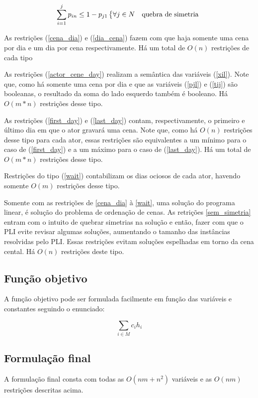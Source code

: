 \documentclass[a4paper,11pt]{article}
\begin{document}
\begin{equation}
  \sum_{i=1}^j p_{in} \leq 1 - p_{j1} \begin{dcases*} \forall j \in N & quebra de simetria \end{dcases*}
  \label{sem_simetria}
\end{equation}

As restrições (\ref{cena_dia}) e (\ref{dia_cena}) fazem com que haja somente uma
cena por dia e um dia por cena respectivamente. Há um total de $O(n)$ restrições
de cada tipo

As restrições (\ref{actor_cene_day}) realizam a semântica das variáveis (\ref{xil}).
Note que, como há somente uma cena por dia e que as variáveis (\ref{pjl}) e (\ref{tij})
são booleanas, o resultado da soma do lado esquerdo também é booleano. Há $O(m*n)$
restrições desse tipo.

As restrições (\ref{first_day}) e (\ref{last_day}) contam, respectivamente, o
primeiro e último dia em que o ator gravará uma cena. Note que, como há $O(n)$
restrições desse tipo para cada ator, essas restrições são equivalentes a um
mínimo para o caso de (\ref{first_day}) e a um máximo para o caso de (\ref{last_day}).
Há um total de $O(m*n)$ restrições desse tipo.

Restrições do tipo (\ref{wait}) contabilizam os dias ociosos de cada ator, havendo
somente $O(m)$ restrições desse tipo.

Somente com as restrições de \ref{cena_dia} à \ref{wait}, uma solução do programa
linear, é solução do problema de ordenação de cenas. As retrições \ref{sem_simetria}
entram com o intuito de quebrar simetrias na solução e então, fazer com que o PLI
evite revisar algumas soluções, aumentando o tamanho das instâncias resolvidas pelo PLI.
Essas restrições evitam soluções espelhadas em torno da cena cental. Há $O(n)$ restrições
deste tipo.

\subsection{Função objetivo}
A função objetivo pode ser formulada facilmente em função das variáveis e constantes
seguindo o enunciado:

\begin{equation}
  \sum_{i \in M} c_i h_i
\end{equation}

\subsection{Formulação final}
A formulação final consta com todas as $O(nm + n^2)$ variáveis e as $O(nm)$
restrições descritas acima.
\end{document}
